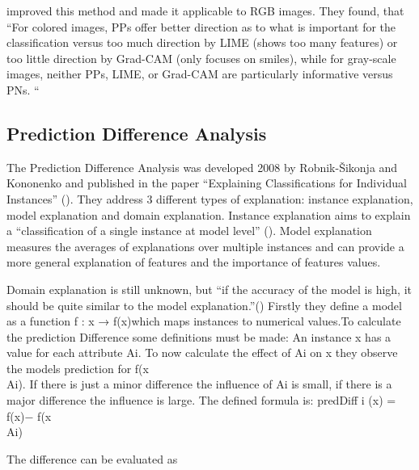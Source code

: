  improved this method and made it applicable to RGB images.
They found, that “For colored images, PPs offer better direction as to what is important for the classification versus too much direction by LIME (shows too many features) or too little direction by Grad-CAM (only focuses on smiles), while for gray-scale images, neither PPs, LIME, or Grad-CAM are particularly informative versus PNs. “ 

\subsection{Prediction Difference Analysis}
The Prediction Difference Analysis was developed 2008 by Robnik-Šikonja and Kononenko and published in the paper “Explaining Classifications for Individual Instances” (). They address 3 different types of explanation: instance explanation, model explanation and domain explanation.  Instance explanation aims to explain a “classification of a single instance at model level” (). Model explanation measures the averages of explanations over multiple instances and can provide a more general explanation of features and the importance of features values.
\par
Domain explanation is still unknown, but “if the accuracy of the model is high, it should be quite similar to the model explanation.”() Firstly they define a model as a function f : x → f(x)which maps instances to numerical values.To calculate the prediction Difference some definitions must be made: An instance x has a value for each attribute Ai. To now calculate the effect of Ai on x they observe the models prediction for  f(x\\Ai). 
If there is just a minor difference the influence of Ai is small, if there is a major difference the influence is large. The defined formula is:
predDiff i (x) = f(x)− f(x\\Ai) 
\par
The difference can be evaluated as 
